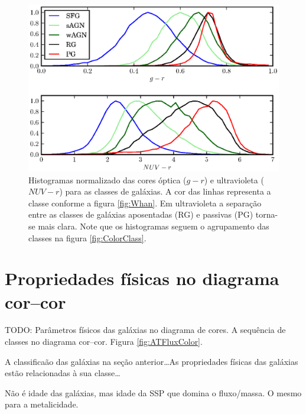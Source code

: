 \begin{figure}
	\includegraphics{figuras/histo_galtype_color.eps}
	\caption[Histogramas de cores para as classes de galáxias.]
	{Histogramas normalizado das cores óptica ($g-r$) e ultravioleta ($NUV-r$) para
	as classes de galáxias. A cor das linhas representa a classe conforme a figura
	\ref{fig:Whan}. Em ultravioleta a separação entre as classes de galáxias
	aposentadas (RG) e passivas (PG) torna-se mais clara. Note que os histogramas
	seguem o agrupamento das classes na figura \ref{fig:ColorClass}.}
	\label{fig:HistogramaCorClasse}
\end{figure}



\section{Propriedades físicas no diagrama cor--cor}

TODO: Parâmetros físicos das galáxias no diagrama de cores. A sequência de
classes no diagrama cor--cor. Figura \ref{fig:ATFluxColor}.

A classificaão das galáxias na seção anterior\ldots As propriedades físicas das
galáxias estão relacionadas à sua classe\ldots

Não é idade das galáxias, mas idade da SSP que domina o fluxo/massa. O mesmo
para a metalicidade.

